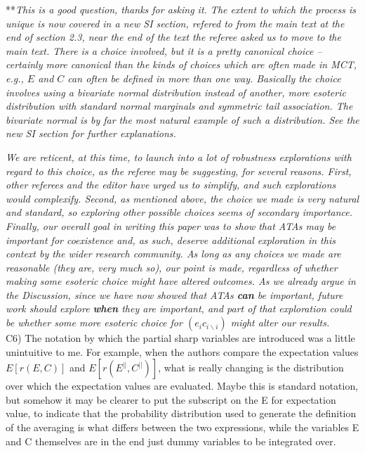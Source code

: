 \documentclass[letterpaper,11pt]{article}
\newcommand{\bs}{\backslash}
\begin{document}
\noindent ***\emph{This is a good question, thanks for asking it. The extent to which the process is 
unique is now covered in a new SI section, refered to from the main text at the end of section 2.3, 
near the end of the text the referee asked us to move to the main text. There is a choice involved,
but it is a pretty canonical choice -- certainly more canonical than the kinds of choices which are often made
in MCT, e.g., $E$ and $C$ can often be defined in more than one way. Basically the choice involves 
using a bivariate normal distribution instead of another, more esoteric 
distribution with standard normal marginals and symmetric tail association. The bivariate normal is by far the 
most natural example of such a distribution. See the new SI section for further explanations. }

\emph{We are reticent, at this time, to launch into a lot of robustness explorations with regard to this choice, 
as the referee may be suggesting, for several reasons. First, other referees and the editor have urged us to
simplify, and such explorations would complexify. Second, as mentioned above, the choice we made is very
natural and standard, so exploring other possible choices seems of 
secondary importance. Finally, our overall goal in writing this paper
was to show that ATAs may be important for coexistence and, as such, deserve additional exploration in this
context by the wider research community. As long as any choices we made are reasonable (they are, very much so), our point is
made, regardless of whether making some esoteric choice might have altered outcomes. As we already argue in the
Discussion, since we have now showed that ATAs \textbf{can} be important, future work should explore \textbf{when} 
they are important, and part of 
that exploration could be whether some more esoteric choice for $(e_i c_{i \bs i})$ might alter our results. }\\

\noindent C6) The notation by which the partial sharp variables are introduced was a little unintuitive to me.  For example, when the authors compare the expectation values 
$E[r(E,C)]$ and $E[r(E^{||},C^{||})]$, what is really changing is the distribution over which the expectation values are evaluated.  Maybe this is standard notation, but somehow it may be clearer to put the subscript on the E for expectation value, to indicate that the probability distribution used to generate the definition of the averaging is what differs between the two expressions, while the variables E and C themselves are in the end just dummy variables to be integrated over.  \\
\end{document}
